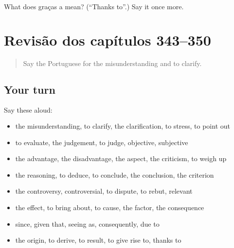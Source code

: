 \begin{tcolorbox}[breakable,colback=teal!4,colframe=teal!35!black,title={Before you move on}]
What does graças a mean? (\textquotedblleft{}Thanks to\textquotedblright{}.) Say it once more.
\end{tcolorbox}
\section[(dialogue)]{Revisão dos capítulos 343–350}

\label{lesson:PT-R350-revisao-343-350}



\begin{quote}
Say the Portuguese for the misunderstanding and to clarify.
\end{quote}

\subsection*{Your turn}
Say these aloud:

\begin{itemize}
\raggedright
  \item the misunderstanding, to clarify, the clarification, to stress, to point out
  \item to evaluate, the judgement, to judge, objective, subjective
  \item the advantage, the disadvantage, the aspect, the criticism, to weigh up
  \item the reasoning, to deduce, to conclude, the conclusion, the criterion
  \item the controversy, controversial, to dispute, to rebut, relevant
  \item the effect, to bring about, to cause, the factor, the consequence
  \item since, given that, seeing as, consequently, due to
  \item the origin, to derive, to result, to give rise to, thanks to
\end{itemize}

